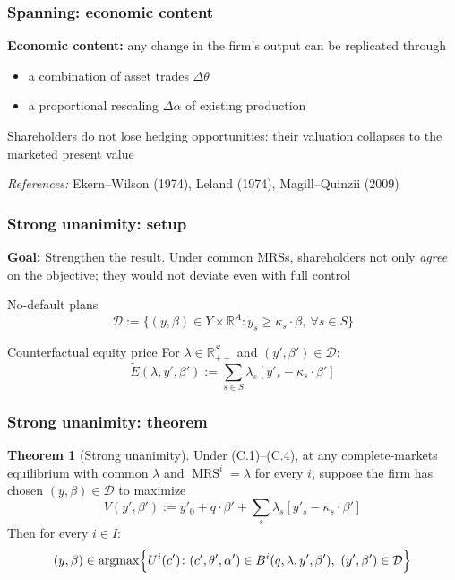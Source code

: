 \documentclass[blue]{beamer}
\def\R{\mathbb{R}}
\def\geq{\geqslant}
\DeclareMathOperator\argmax{argmax}
\DeclareMathOperator\MRS{MRS}
\theoremstyle{definition}
\theoremstyle{example}
\newtheorem*{theoremns}{Theorem}
\begin{document}
\begin{frame}\frametitle{Spanning: economic content}
\textbf{Economic content:} any change in the firm's output can be replicated through
\begin{itemize}
\item a combination of asset trades $\Delta \theta$
\item a proportional rescaling $\Delta \alpha$ of existing production
\end{itemize}
\bigskip

Shareholders do not lose hedging opportunities: their valuation collapses to the marketed present value
\bigskip

\emph{References:} Ekern--Wilson (1974), Leland (1974), Magill--Quinzii (2009)
\end{frame}

\begin{frame}\frametitle{Strong unanimity: setup}
\textbf{Goal:} Strengthen the result. Under common MRSs, shareholders not only \emph{agree} on the objective; they would not deviate even with full control
\bigskip

\begin{block}{No-default plans}
\begin{equation*}
\mathcal{D} := \bigl\{ (y, \beta) \in Y \times \R^A \colon y_s \geq \kappa_s \cdot \beta, \ \forall s \in S \bigr\}
\end{equation*}
\end{block}

\begin{block}{Counterfactual equity price}
For $\lambda \in \R^S_{++}$ and $(y', \beta') \in \mathcal{D}$:
\begin{equation*}
\widetilde{E}(\lambda, y', \beta') := \sum_{s \in S} \lambda_s [y'_s - \kappa_s \cdot \beta']
\end{equation*}
\end{block}
\end{frame}

\begin{frame}\frametitle{Strong unanimity: theorem}
\begin{theoremns}[Strong unanimity]
Under (C.1)--(C.4), at any complete-markets equilibrium with common $\lambda$ and $\MRS^i = \lambda$ for every $i$, suppose the firm has chosen $(y, \beta) \in \mathcal{D}$ to maximize
\begin{equation*}
V(y', \beta') := y'_0 + q \cdot \beta' + \sum_{s} \lambda_s [y'_s - \kappa_s \cdot \beta']
\end{equation*}
Then for every $i \in I$:
\begin{equation*}
(y, \beta) \in \argmax \Bigl\{ U^i(c') \colon (c', \theta', \alpha') \in B^i(q, \lambda, y', \beta'), \ (y', \beta') \in \mathcal{D} \Bigr\}
\end{equation*}
\end{theoremns}
\end{frame}
\end{document}
